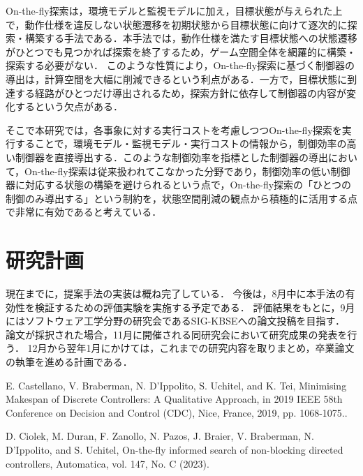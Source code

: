 \documentclass[11pt]{jarticle}
\begin{document}
On-the-fly探索\cite{ddcs}は，環境モデルと監視モデルに加え，目標状態が与えられた上で，動作仕様を違反しない状態遷移を初期状態から目標状態に向けて逐次的に探索・構築する手法である．本手法では，動作仕様を満たす目標状態への状態遷移がひとつでも見つかれば探索を終了するため，ゲーム空間全体を網羅的に構築・探索する必要がない．
このような性質により，On-the-fly探索に基づく制御器の導出は，計算空間を大幅に削減できるという利点がある．一方で，目標状態に到達する経路がひとつだけ導出されるため，探索方針に依存して制御器の内容が変化するという欠点がある．

そこで本研究では，各事象に対する実行コストを考慮しつつOn-the-fly探索を実行することで，環境モデル・監視モデル・実行コストの情報から，制御効率の高い制御器を直接導出する．このような制御効率を指標とした制御器の導出において，On-the-fly探索は従来扱われてこなかった分野であり，制御効率の低い制御器に対応する状態の構築を避けられるという点で，On-the-fly探索の「ひとつの制御のみ導出する」という制約を，状態空間削減の観点から積極的に活用する点で非常に有効であると考えている．




\section{研究計画}
現在までに，提案手法の実装は概ね完了している．
今後は，8月中に本手法の有効性を検証するための評価実験を実施する予定である．
評価結果をもとに，9月にはソフトウェア工学分野の研究会であるSIG-KBSEへの論文投稿を目指す．
論文が採択された場合，11月に開催される同研究会において研究成果の発表を行う．
12月から翌年1月にかけては，これまでの研究内容を取りまとめ，卒業論文の執筆を進める計画である．


\begin{thebibliography}{99} %
{\footnotesize

E. Castellano, V. Braberman, N. D'Ippolito, S. Uchitel, and K. Tei, 
Minimising Makespan of Discrete Controllers: A Qualitative Approach,
in 2019 IEEE 58th
Conference on Decision and Control (CDC), Nice, France, 2019, pp. 1068-1075..

D. Ciolek, M. Duran, F. Zanollo, N. Pazos, J. Braier, V. Braberman, N. D'Ippolito, and S.
Uchitel, On-the-fly informed search of non-blocking directed controllers,
Automatica, vol. 147, No. C (2023).

}
\end{thebibliography} %

\end{document}
